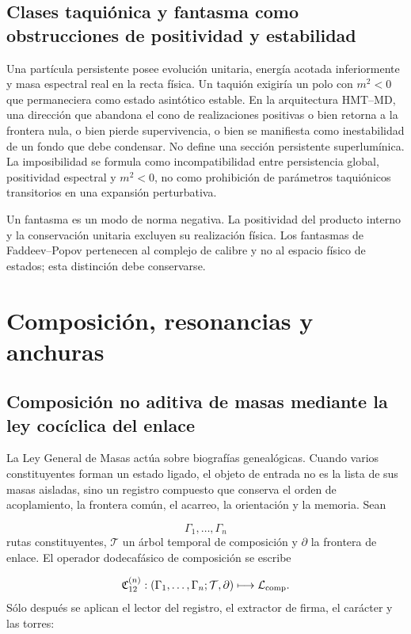 \subsection{Clases taquiónica y fantasma como obstrucciones de positividad y estabilidad}
Una partícula persistente posee evolución unitaria, energía acotada inferiormente y masa espectral real en la recta física. Un taquión exigiría un polo con \(m^2<0\) que permaneciera como estado asintótico estable. En la arquitectura HMT--MD, una dirección que abandona el cono de realizaciones positivas o bien retorna a la frontera nula, o bien pierde supervivencia, o bien se manifiesta como inestabilidad de un fondo que debe condensar. No define una sección persistente superlumínica. La imposibilidad se formula como incompatibilidad entre persistencia global, positividad espectral y \(m^2<0\), no como prohibición de parámetros taquiónicos transitorios en una expansión perturbativa.

Un fantasma es un modo de norma negativa. La positividad del producto interno y la conservación unitaria excluyen su realización física. Los fantasmas de Faddeev--Popov pertenecen al complejo de calibre y no al espacio físico de estados; esta distinción debe conservarse.

\section{Composición, resonancias y anchuras}
\subsection{Composición no aditiva de masas mediante la ley cocíclica del enlace}
La Ley General de Masas actúa sobre biografías genealógicas. Cuando varios constituyentes forman un estado ligado, el objeto de entrada no es la lista de sus masas aisladas, sino un registro compuesto que conserva el orden de acoplamiento, la frontera común, el acarreo, la orientación y la memoria. Sean

\[
\Gamma_1,\ldots,\Gamma_n
\]
rutas constituyentes, \(\mathcal T\) un árbol temporal de composición y \(\partial\) la frontera de enlace. El operador dodecafásico de composición se escribe

\[
\mathfrak C_{12}^{(n)}:
(\Gamma_1,\ldots,\Gamma_n;\mathcal T,\partial)
\longmapsto \mathcal L_{\rm comp}.
\]
Sólo después se aplican el lector del registro, el extractor de firma, el carácter y las torres:

